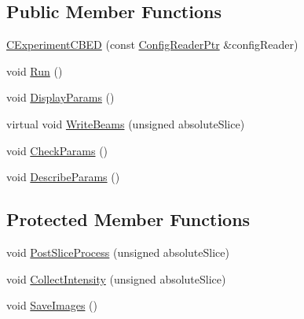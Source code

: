 \subsection*{Public Member Functions}
\begin{DoxyCompactItemize}
\item 
\hyperlink{class_q_s_t_e_m_1_1_c_experiment_c_b_e_d_ada78bbac5cc3edf81898647576466980}{C\-Experiment\-C\-B\-E\-D} (const \hyperlink{namespace_q_s_t_e_m_af9424707fe9f6503298f49b41304bd35}{Config\-Reader\-Ptr} \&config\-Reader)
\item 
void \hyperlink{class_q_s_t_e_m_1_1_c_experiment_c_b_e_d_acb7adf203c7ea7f9c5a5d7f0d5094a2d}{Run} ()
\item 
void \hyperlink{class_q_s_t_e_m_1_1_c_experiment_c_b_e_d_a85676f14d445c485a54b79c16fbb921a}{Display\-Params} ()
\item 
virtual void \hyperlink{class_q_s_t_e_m_1_1_c_experiment_c_b_e_d_ab5cb9b8984fc1ed9863543cec5cdd018}{Write\-Beams} (unsigned absolute\-Slice)
\item 
void \hyperlink{class_q_s_t_e_m_1_1_c_experiment_c_b_e_d_a3303caf4c356c07e0f40e3314c8f6a21}{Check\-Params} ()
\item 
void \hyperlink{class_q_s_t_e_m_1_1_c_experiment_c_b_e_d_a976a152b84e2b721eb8a26ac1e51556a}{Describe\-Params} ()
\end{DoxyCompactItemize}
\subsection*{Protected Member Functions}
\begin{DoxyCompactItemize}
\item 
void \hyperlink{class_q_s_t_e_m_1_1_c_experiment_c_b_e_d_ae476872fbc8e6d90071a36b7afd96345}{Post\-Slice\-Process} (unsigned absolute\-Slice)
\item 
void \hyperlink{class_q_s_t_e_m_1_1_c_experiment_c_b_e_d_a6f6624fa420e7127e6b2261260063cb6}{Collect\-Intensity} (unsigned absolute\-Slice)
\item 
void \hyperlink{class_q_s_t_e_m_1_1_c_experiment_c_b_e_d_a5a4dc89c9b4596f280c4794bc1f4870b}{Save\-Images} ()
\end{DoxyCompactItemize}
